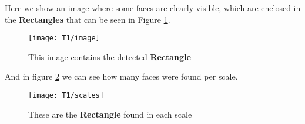 \noindent Here we show an image where some faces are clearly visible, which are enclosed in the \textbf{Rectangles} that can be seen in Figure \ref{fig:image}.\\


\begin{figure}[h!]
	\centering
	\texttt{[image: T1/image]}
	\caption{This image contains the detected \textbf{Rectangle}}
	\label{fig:image}
\end{figure}
\noindent And in figure \ref{fig:scale} we can see how many faces were found per scale.
\begin{figure}[h!]
	\centering
	\texttt{[image: T1/scales]}
	\caption{These are the \textbf{Rectangle} found in each scale}
	\label{fig:scale}
\end{figure}